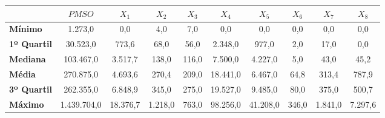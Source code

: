\documentclass{article}
\begin{document}
\begin{table}[]
	\centering
	\begin{tabular}{l|ccccccccc}
		& \textbf{$PMSO$} & \textbf{{$X_1$}} & \textbf{$X_2$} & \textbf{$X_3$} & \textbf{$X_4$} & \textbf{$X_5$} & \textbf{$X_6$} & \textbf{$X_7$} & \textbf{$X_8$} \\ \hline \hline
		\textbf{Mínimo}     & 1.273,0       & 0,0         & 4,0         & 7,0         & 0,0         & 0,0         & 0,0         & 0,0         & 0,0         \\
		\textbf{1º Quartil} & 30.523,0      & 773,6       & 68,0        & 56,0        & 2.348,0     & 977,0       & 2,0         & 17,0        & 0,0         \\
		\textbf{Mediana}    & 103.467,0     & 3.517,7     & 138,0       & 116,0       & 7.500,0     & 4.227,0     & 5,0         & 43,0        & 45,2        \\
		\textbf{Média}      & 270.875,0     & 4.693,6     & 270,4       & 209,0       & 18.441,0    & 6.467,0     & 64,8        & 313,4       & 787,9       \\
		\textbf{3º Quartil} & 262.355,0     & 6.848,9     & 345,0       & 275,0       & 19.527,0    & 9.485,0     & 80,0        & 375,0       & 500,7       \\
		\textbf{Máximo}     & 1.439.704,0   & 18.376,7    & 1.218,0     & 763,0       & 98.256,0    & 41.208,0    & 346,0       & 1.841,0     & 7.297,6     \\ \hline \hline
	\end{tabular}
\end{table}
\end{document}
